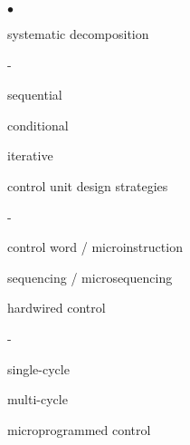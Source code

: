 \begin{minipage}[t]{3in}
\begin{list}{$\bullet$}{\setlength{\itemsep}{0pt}\setlength{\parskip}{0pt}%
\setlength{\topsep}{0pt}\setlength{\partopsep}{0pt}\setlength{\parsep}{0pt}}

\item{systematic decomposition}
\begin{list}{-}{\setlength{\itemsep}{0pt}\setlength{\parskip}{0pt}%
\setlength{\topsep}{0pt}\setlength{\partopsep}{0pt}\setlength{\parsep}{0pt}}
\item{sequential}
\item{conditional}
\item{iterative}
\end{list}

%

\item{control unit design strategies}
\begin{list}{-}{\setlength{\itemsep}{0pt}\setlength{\parskip}{0pt}%
\setlength{\topsep}{0pt}\setlength{\partopsep}{0pt}\setlength{\parsep}{0pt}}
\item{control word / microinstruction}
\item{sequencing / microsequencing}
\item{hardwired control}
\begin{list}{-}{\setlength{\itemsep}{0pt}\setlength{\parskip}{0pt}%
\setlength{\topsep}{0pt}\setlength{\partopsep}{0pt}\setlength{\parsep}{0pt}}
\item{single-cycle}
\item{multi-cycle}
\end{list}
\item{microprogrammed control}
\end{list}


\end{list}
\end{minipage}
